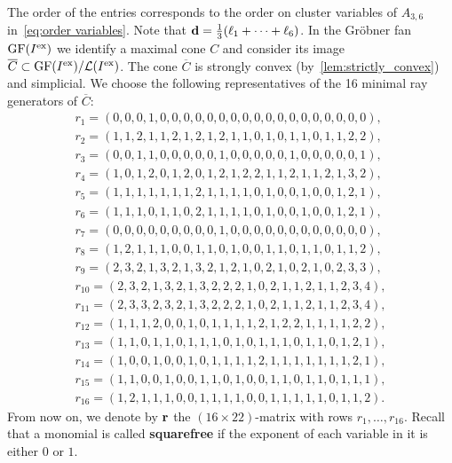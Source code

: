 \documentclass[10pt,a4paper]{amsart}
\newcommand{\thref}[1]{\ref{#1}}
\numberwithin{equation}{section}
\DeclareMathOperator{\GF}{GF}
\begin{document}
The order of the entries corresponds to the order on cluster variables of $A_{3,6}$ in~\eqref{eq:order variables}.
Note that ${\bf d}=\frac{1}{3}(\ell_1+\dots+\ell_6)$.
In the Gr\"obner fan $\GF(I^{\rm ex})$ we identify a maximal cone $C$ and consider its image $\overline{C}\subset \GF(I^{\rm ex})/\mathcal L(I^{\rm ex})$.
The cone $\overline{C}$ is strongly convex (by~\thref{lem:strictly_convex}) and simplicial.
We choose the following representatives of the 16 minimal ray generators of $\overline{C}$:
\begin{gather}
 r_{1}=(0, 0, 0, 1, 0, 0, 0, 0, 0, 0, 0, 0, 0, 0, 0, 0, 0, 0, 0, 0, 0, 0),\nonumber\\
 r_{2}=(1, 1, 2, 1, 1, 2, 1, 2, 1, 2, 1, 1, 0, 1, 0, 1, 1, 0, 1, 1, 2, 2),\nonumber\\
 r_{3}=(0, 0, 1, 1, 0, 0, 0, 0, 0, 1, 0, 0, 0, 0, 0, 1, 0, 0, 0, 0, 0, 1),\nonumber\\
 r_{4}=(1, 0, 1, 2, 0, 1, 2, 0, 1, 2, 1, 2, 2, 1, 1, 2, 1, 1, 2, 1, 3, 2),\nonumber\\
 r_{5}=(1, 1, 1, 1, 1, 1, 1, 2, 1, 1, 1, 1, 0, 1, 0, 0, 1, 0, 0, 1, 2, 1),\nonumber\\
 r_{6}=(1, 1, 1, 0, 1, 1, 0, 2, 1, 1, 1, 1, 0, 1, 0, 0, 1, 0, 0, 1, 2, 1),\nonumber\\
 r_{7}=(0, 0, 0, 0, 0, 0, 0, 0, 0, 1, 0, 0, 0, 0, 0, 0, 0, 0, 0, 0, 0, 0),\nonumber\\
 r_{8}=(1, 2, 1, 1, 1, 0, 0, 1, 1, 0, 1, 0, 0, 1, 1, 0, 1, 1, 0, 1, 1, 2),\nonumber\\
 r_{9}=(2, 3, 2, 1, 3, 2, 1, 3, 2, 1, 2, 1, 0, 2, 1, 0, 2, 1, 0, 2, 3, 3),\nonumber\\
r_{10}=(2, 3, 2, 1, 3, 2, 1, 3, 2, 2, 2, 1, 0, 2, 1, 1, 2, 1, 1, 2, 3, 4),\nonumber\\
r_{11}=(2, 3, 3, 2, 3, 2, 1, 3, 2, 2, 2, 1, 0, 2, 1, 1, 2, 1, 1, 2, 3, 4),\nonumber\\
r_{12}=(1, 1, 1, 2, 0, 0, 1, 0, 1, 1, 1, 1, 2, 1, 2, 2, 1, 1, 1, 1, 2, 2),\nonumber\\
r_{13}=(1, 1, 0, 1, 1, 0, 1, 1, 1, 0, 1, 0, 1, 1, 1, 0, 1, 1, 0, 1, 2, 1),\nonumber\\
r_{14}=(1, 0, 0, 1, 0, 0, 1, 0, 1, 1, 1, 1, 2, 1, 1, 1, 1, 1, 1, 1, 2, 1),\nonumber\\
r_{15}=(1, 1, 0, 0, 1, 0, 0, 1, 1, 0, 1, 0, 0, 1, 1, 0, 1, 1, 0, 1, 1, 1),\nonumber\\
r_{16}=(1, 2, 1, 1, 1, 0, 0, 1, 1, 1, 1, 0, 0, 1, 1, 1, 1, 1, 0, 1, 1, 2).\label{eq:rays of C}
\end{gather}
From now on, we denote by ${\bf r}$ the $(16\times 22)$-matrix with rows $r_1,\dots,r_{16}$.
Recall that a monomial is called {\bf squarefree} if the exponent of each variable in it is either $0$ or $1$.
\end{document}
